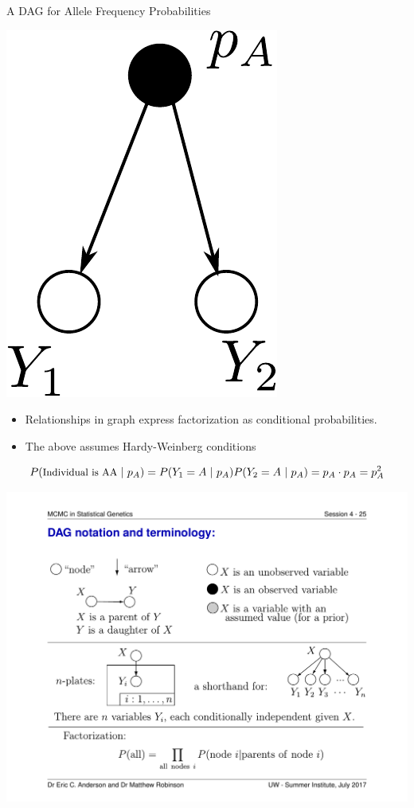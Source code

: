 \documentclass[letter,graphicx]{beamer}
\begin{document}
\begin{frame}{A DAG for Allele Frequency Probabilities}

\begin{center}
\includegraphics[height=.30\textheight]{../diagrams/slide_simple1-crop.pdf}
\end{center}
\begin{itemize}
\item Relationships in graph express factorization as conditional probabilities.
\item The above assumes Hardy-Weinberg conditions
\end{itemize}
$$
\small
P(\mbox{Individual is AA}~|~p_A) = P(Y_1 = A~|~p_A) P(Y_2 = A~|~p_A) = p_A \cdot p_A =  p_A^2
$$
\end{frame}





\begin{frame}{}
\begin{center}
\includegraphics[width=.95\textwidth]{../slide_grabs/dag-notes.pdf}
\end{center}
\end{frame}
\end{document}

